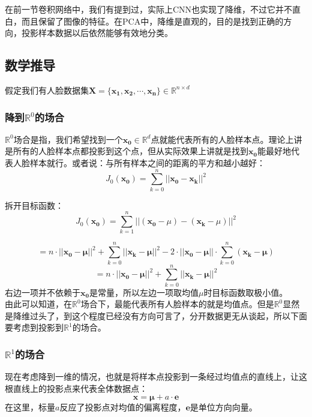 \documentclass{article}
\begin{document}
在前一节卷积网络中，我们有提到过，实际上CNN也实现了降维，不过它并不直白，而且保留了图像的特征。在PCA中，降维是直观的，目的是找到正确的方向，投影样本数据以后依然能够有效地分类。

\subsection{数学推导}

假定我们有人脸数据集$\mathbf{X} = \{\mathbf{x_1}, \mathbf{x_2}, \cdots, \mathbf{x_n} \} \in \mathbb{R}^{n \times d}$

\subsubsection{降到$\mathbb{R}^0$的场合}

$\mathbb{R}^0$场合是指，我们希望找到一个$\mathbf{x_0} \in \mathbb{R}^{d}$点就能代表所有的人脸样本点。理论上讲是所有的人脸样本点都投影到这个点，但从实际效果上讲就是找到$\mathbf{x_0}$能最好地代表人脸样本就行。或者说：与所有样本之间的距离的平方和越小越好：
\[ J_0(\mathbf{x_0}) = \sum_{k = 0}^n || \mathbf{x_0} - \mathbf{x_k} ||^2 \]

拆开目标函数：
\[ J_0(\mathbf{x_0}) = \sum_{k = 1}^n || (\mathbf{x_0} - \mu ) - ( \mathbf{x_k} - \mu ) ||^2 \]

\[  = n\cdot || \mathbf{x_0} - \mathbf{\mu} ||^2 + \sum_{k = 0}^n || \mathbf{x_k} - \mathbf{\mu} ||^2  - 2 \cdot ||\mathbf{x_0} - \mathbf{\mu} || \cdot  \sum_{k = 0}^n ( \mathbf{x_k} - \mathbf{\mu} ) \]
\[  = n \cdot || \mathbf{x_0} - \mathbf{\mu} ||^2 + \sum_{k = 0}^n || \mathbf{x_k} - \mathbf{\mu} ||^2  \]
右边一项并不依赖于$\mathbf{x_0}$是常量，所以左边一项取均值$\mu$时目标函数取极小值。\\

由此可以知道，在$\mathbb{R}^0$场合下，最能代表所有人脸样本的就是均值点。但是$\mathbb{R}^0$显然是降维过头了，到这个程度已经没有方向可言了，分开数据更无从谈起，所以下面要考虑到投影到$\mathbb{R}^1$的场合。

\subsubsection{$\mathbb{R}^1$的场合}

现在考虑降到一维的情况，也就是将样本点投影到一条经过均值点的直线上，让这根直线上的投影点来代表全体数据点：
\[ \mathbf{x} = \mathbf{\mu} + a \cdot \mathbf{e} \]
在这里，标量$a$反应了投影点对均值的偏离程度，$\mathbf{e}$是单位方向向量。\\
\end{document}
